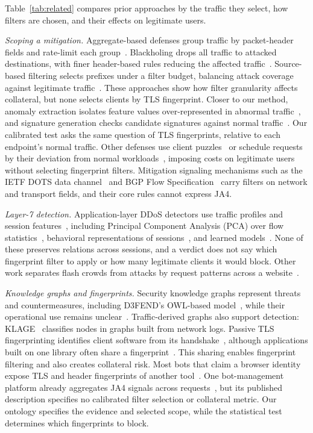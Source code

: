 \documentclass[conference,letterpaper,10pt]{IEEEtran}
\newcommand\1{\textit{(i)}}
\newcommand\2{\textit{(ii)}}
\newcommand\3{\textit{(iii)}}
\newcommand\4{\textit{(iv)}}
\newcommand\5{\textit{(v)}}
\newcommand\6{\textit{(vi)}}
\newcommand\7{\textit{(vii)}}
\newcommand\8{\textit{(viii)}}
\newcommand\9{\textit{(ix)}}
\begin{document}
Table~\ref{tab:related} compares prior approaches by
the traffic they select, how filters are chosen, and
their effects on legitimate users.

\textit{Scoping a mitigation.}
Aggregate-based defenses group traffic by packet-header
fields and rate-limit each
group~\cite{mahajan2002pushback,alcoz2022accturbo}.
Blackholing drops all traffic to attacked destinations,
with finer header-based rules reducing the affected
traffic~\cite{dietzel2018stellar}.
Source-based filtering selects prefixes under a
filter budget, balancing attack coverage against
legitimate traffic~\cite{soldo2012filtering}.
These approaches show how filter granularity affects
collateral, but none selects clients by TLS fingerprint.
Closer to our method, anomaly extraction isolates feature
values over-represented in abnormal
traffic~\cite{silveira2010urca,brauckhoff2009extraction},
and signature generation checks candidate signatures against
normal traffic~\cite{li2006hamsa}. Our calibrated test asks
the same question of TLS fingerprints, relative to each
endpoint's normal traffic. Other
defenses use client
puzzles~\cite{kandula2005botz} or schedule requests by their
deviation from normal workloads~\cite{ranjan2009ddosshield},
imposing costs on
legitimate users without selecting fingerprint filters.
Mitigation signaling mechanisms such as the IETF DOTS
data channel~\cite{dots2020data} and BGP Flow
Specification~\cite{rfc8955flowspec} carry filters on
network and transport fields, and their core rules cannot
express JA4.

\textit{Layer-7 detection.}
Application-layer DDoS detectors use traffic profiles
and session features~\cite{tripathi2021application},
including Principal Component Analysis (PCA) over flow
statistics~\cite{fernandes2015autonomous}, behavioral
representations of sessions~\cite{bharathi2012pca},
and learned models~\cite{kemp2023approach}.
None of these preserves relations across sessions, and a
verdict does not say which fingerprint filter to apply or
how many legitimate clients it would block. Other work
separates flash crowds from attacks by request patterns
across a website~\cite{xie2009monitoring}.

\textit{Knowledge graphs and fingerprints.}
Security knowledge graphs represent threats and
countermeasures, including D3FEND's OWL-based
model~\cite{kaloroumakis2021d3fend}, while their operational
use remains unclear~\cite{liu2022recent}.
Traffic-derived graphs also support detection:
KLAGE~\cite{belcastro2025klage} classifies nodes in graphs
built from network logs.
Passive TLS fingerprinting identifies client software from
its handshake~\cite{husak2016https}, although applications
built on one library often share a
fingerprint~\cite{anderson2019tls}.
This sharing enables fingerprint filtering and also creates
collateral risk.
Most bots that claim a browser identity expose TLS and
header fingerprints of another tool~\cite{li2021goodbot}.
One bot-management platform already aggregates JA4 signals
across requests~\cite{martinetti2024ja4signals},
but its published description specifies no calibrated filter
selection or collateral metric.
Our ontology specifies the evidence and selected
scope, while the statistical test determines
which fingerprints to block.
\end{document}
